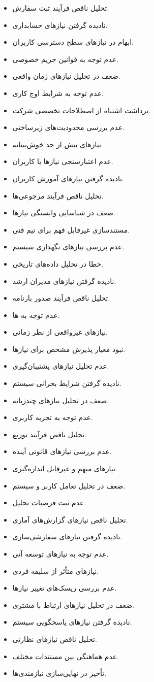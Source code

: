 \documentclass[12pt,a4paper]{report}
\begin{document}
\begin{itemize}
عدم هماهنگی با واحد فناوری اطلاعات.
\item 
تحلیل ناقص فرآیند ثبت سفارش.
\item 
نادیده گرفتن نیازهای حسابداری.
\item 
ابهام در نیازهای سطح دسترسی کاربران.
\item 
عدم توجه به قوانین حریم خصوصی.
\item 
ضعف در تحلیل نیازهای زمان واقعی.
\item 
عدم توجه به شرایط اوج کاری.
\item 
برداشت اشتباه از اصطلاحات تخصصی شرکت.
\item 
عدم بررسی محدودیت‌های زیرساختی.
\item 
نیازهای بیش از حد خوش‌بینانه.
\item 
عدم اعتبارسنجی نیازها با کاربران.
\item 
نادیده گرفتن نیازهای آموزش کاربران.
\item 
تحلیل ناقص فرآیند مرجوعی‌ها.
\item 
ضعف در شناسایی وابستگی نیازها.
\item 
مستندسازی غیرقابل فهم برای تیم فنی.
\item 
عدم بررسی نیازهای نگهداری سیستم.
\item 
خطا در تحلیل داده‌های تاریخی.
\item 
نادیده گرفتن نیازهای مدیران ارشد.
\item 
تحلیل ناقص فرآیند صدور بارنامه.
\item 
عدم توجه به ها.
\item 
نیازهای غیرواقعی از نظر زمانی.
\item 
نبود معیار پذیرش مشخص برای نیازها.
\item 
عدم تحلیل نیازهای پشتیبان‌گیری.
\item 
نادیده گرفتن شرایط بحرانی سیستم.
\item 
ضعف در تحلیل نیازهای چندزبانه.
\item 
عدم توجه به تجربه کاربری.
\item 
تحلیل ناقص فرآیند توزیع.
\item 
عدم بررسی نیازهای قانونی آینده.
\item 
نیازهای مبهم و غیرقابل اندازه‌گیری.
\item 
ضعف در تحلیل تعامل کاربر و سیستم.
\item 
عدم ثبت فرضیات تحلیل.
\item 
تحلیل ناقص نیازهای گزارش‌های آماری.
\item 
نادیده گرفتن نیازهای سفارشی‌سازی.
\item 
عدم توجه به نیازهای توسعه آتی.
\item 
نیازهای متأثر از سلیقه فردی.
\item 
عدم بررسی ریسک‌های تغییر نیازها.
\item 
ضعف در تحلیل نیازهای ارتباط با مشتری.
\item 
نادیده گرفتن نیازهای پاسخگویی سیستم.
\item 
تحلیل ناقص نیازهای نظارتی.
\item 
عدم هماهنگی بین مستندات مختلف.
\item 
تأخیر در نهایی‌سازی نیازمندی‌ها.
\end{itemize}
\end{document}
